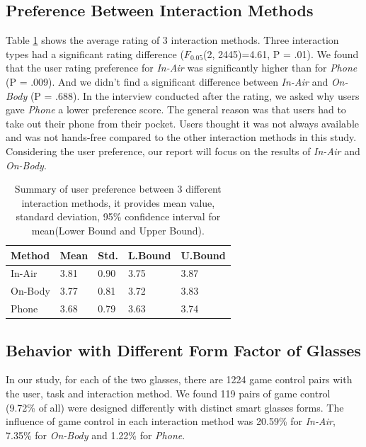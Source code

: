\documentclass{sigchi}
\newcommand\tabhead[1]{\small\textbf{#1}}
\begin{document}
  \subsection{Preference Between Interaction Methods}
  Table \ref{tab:tablePreferenceInteractionMethod} shows the average rating of 3 interaction methods. Three interaction types had a significant rating difference ($F_{0.05}$(2, 2445)=4.61, P = .01). We found that the user rating preference for \emph{In-Air} was significantly higher than for \emph{Phone} (P = .009). And we didn't find a significant difference between \emph{In-Air} and \emph{On-Body} (P = .688).
  In the interview conducted after the rating, we asked why users gave \emph{Phone} a lower preference score.
  The general reason was that users had to take out their phone from their pocket. Users thought it was not always available and was not hands-free compared to the other interaction methods in this study. Considering the user preference, our report will focus on the results of \emph{In-Air} and \emph{On-Body}.

  \begin{table}
    \centering
    \begin{tabular}{|l|l|l|l|l|}
      \hline
      \tabhead{Method} &
      \multicolumn{1}{|p{0.13\columnwidth}|}{\centering\tabhead{Mean}} &
      \multicolumn{1}{|p{0.13\columnwidth}|}{\centering\tabhead{Std.}} &
      \multicolumn{1}{|p{0.13\columnwidth}|}{\centering\tabhead{L.Bound}} &
      \multicolumn{1}{|p{0.13\columnwidth}|}{\centering\tabhead{U.Bound}} \\
      \hline
      In-Air & 3.81 & 0.90 & 3.75 & 3.87\\
      \hline
      On-Body & 3.77 & 0.81 & 3.72 & 3.83\\
      \hline
      Phone & 3.68 & 0.79 & 3.63 & 3.74\\
      \hline

    \end{tabular}
    \caption{Summary of user preference between 3 different interaction methods, it provides mean value, standard deviation, 95\% confidence interval for mean(Lower Bound and Upper Bound).}
    \label{tab:tablePreferenceInteractionMethod}
  \end{table}

  \subsection{Behavior with Different Form Factor of Glasses}
  In our study, for each of the two glasses, there are 1224 game control pairs with the user, task and interaction method. We found 119 pairs of game control (9.72\% of all) were designed differently with distinct smart glasses forms. The influence of game control in each interaction method was 20.59\% for \emph{In-Air}, 7.35\% for \emph{On-Body} and 1.22\% for \emph{Phone}. 
\end{document}
